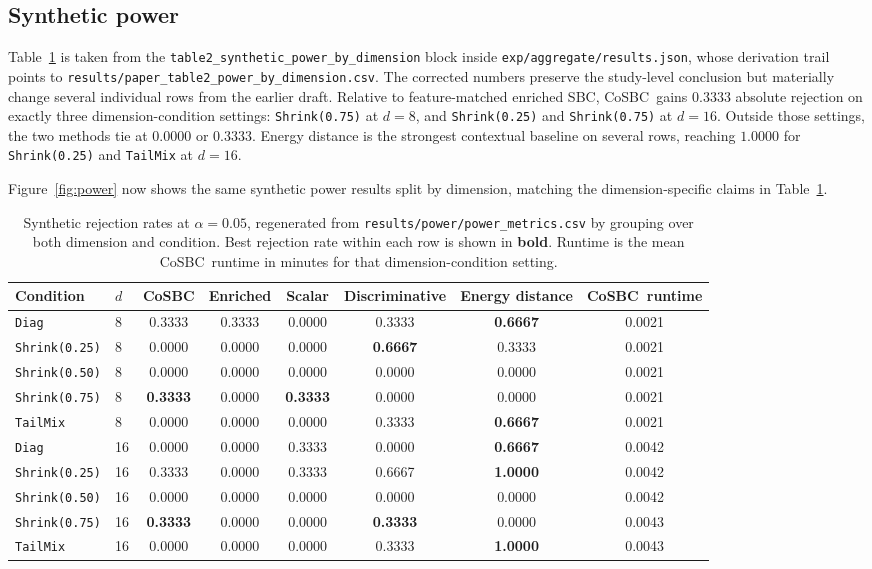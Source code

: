 \documentclass[10pt,twocolumn]{article}
\newcommand{\method}{CoSBC}
\newcommand{\1}{\mathbf{1}}
\begin{document}
\subsection{Synthetic power}
Table~\ref{tab:power} is taken from the \texttt{table2\_synthetic\_power\_by\_dimension} block inside \texttt{exp/aggregate/results.json}, whose derivation trail points to \texttt{results/paper\_table2\_power\_by\_dimension.csv}. The corrected numbers preserve the study-level conclusion but materially change several individual rows from the earlier draft. Relative to feature-matched enriched SBC, \method\ gains $0.3333$ absolute rejection on exactly three dimension-condition settings: \texttt{Shrink(0.75)} at $d=8$, and \texttt{Shrink(0.25)} and \texttt{Shrink(0.75)} at $d=16$. Outside those settings, the two methods tie at $0.0000$ or $0.3333$. Energy distance is the strongest contextual baseline on several rows, reaching $1.0000$ for \texttt{Shrink(0.25)} and \texttt{TailMix} at $d=16$.

Figure~\ref{fig:power} now shows the same synthetic power results split by dimension, matching the dimension-specific claims in Table~\ref{tab:power}.

\begin{table}[t]
\caption{Synthetic rejection rates at $\alpha=0.05$, regenerated from \texttt{results/power/power\_metrics.csv} by grouping over both dimension and condition. Best rejection rate within each row is shown in \textbf{bold}. Runtime is the mean \method\ runtime in minutes for that dimension-condition setting.}
\label{tab:power}
\centering
\small
\begin{tabular}{llcccccc}
\toprule
Condition & $d$ & \method & Enriched & Scalar & Discriminative & Energy distance & \method\ runtime \\
\midrule
\texttt{Diag} & 8 & 0.3333 & 0.3333 & 0.0000 & 0.3333 & \textbf{0.6667} & 0.0021 \\
\texttt{Shrink(0.25)} & 8 & 0.0000 & 0.0000 & 0.0000 & \textbf{0.6667} & 0.3333 & 0.0021 \\
\texttt{Shrink(0.50)} & 8 & 0.0000 & 0.0000 & 0.0000 & 0.0000 & 0.0000 & 0.0021 \\
\texttt{Shrink(0.75)} & 8 & \textbf{0.3333} & 0.0000 & \textbf{0.3333} & 0.0000 & 0.0000 & 0.0021 \\
\texttt{TailMix} & 8 & 0.0000 & 0.0000 & 0.0000 & 0.3333 & \textbf{0.6667} & 0.0021 \\
\midrule
\texttt{Diag} & 16 & 0.0000 & 0.0000 & 0.3333 & 0.0000 & \textbf{0.6667} & 0.0042 \\
\texttt{Shrink(0.25)} & 16 & 0.3333 & 0.0000 & 0.3333 & 0.6667 & \textbf{1.0000} & 0.0042 \\
\texttt{Shrink(0.50)} & 16 & 0.0000 & 0.0000 & 0.0000 & 0.0000 & 0.0000 & 0.0042 \\
\texttt{Shrink(0.75)} & 16 & \textbf{0.3333} & 0.0000 & 0.0000 & \textbf{0.3333} & 0.0000 & 0.0043 \\
\texttt{TailMix} & 16 & 0.0000 & 0.0000 & 0.0000 & 0.3333 & \textbf{1.0000} & 0.0043 \\
\bottomrule
\end{tabular}
\end{table}
\end{document}
